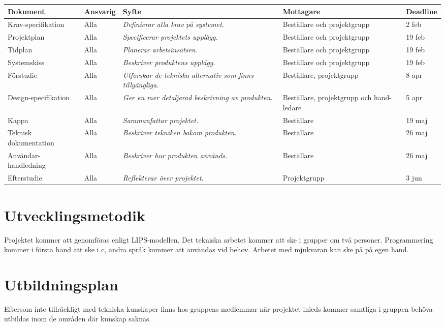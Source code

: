 \documentclass[11pt]{article}
\begin{document}
\begin{flushleft}
\begin{longtable}{| p{.17\linewidth} | p{.11\linewidth} | p{.31\linewidth} | p{.15\linewidth} | p{.11\linewidth} |} \hline
\textbf{Dokument} & \textbf{Ansvarig} & \textbf{Syfte} & \textbf{Mottagare} & \textbf{Deadline} \\ \hline
Krav-specifikation & Alla & \textit{Definierar alla krav på systemet.} & Beställare och projektgrupp & 2 feb \\ \hline
Projektplan & Alla & \textit{Specificerar projektets upplägg.} & Beställare och projektgrupp & 19 feb \\ \hline
Tidplan & Alla & \textit{Planerar arbetsinsatsen.} & Beställare och projektgrupp & 19 feb \\ \hline
Systemskiss & Alla & \textit{Beskriver produktens upplägg.} & Beställare och projektgrupp & 19 feb \\ \hline
Förstudie & Alla & \textit{Utforskar de tekniska alternativ som finns tillgängliga.} & Beställare, projektgrupp & 8 apr \\ \hline
Design-specifikation & Alla & \textit{Ger en mer detaljerad beskrivning av produkten.} & Beställare, projektgrupp och hand-ledare & 5 apr \\ \hline
Kappa & Alla & \textit{Sammanfattar projektet.} & Beställare & 19 maj \\ \hline
Teknisk \mbox{dokumentation} & Alla & \textit{Beskriver tekniken bakom produkten.} & Beställare & 26 maj\\ \hline
Användar-handledning & Alla & \textit{Beskriver hur produkten används.} & Beställare & 26 maj \\ \hline
Efterstudie & Alla & \textit{Reflekterar över projektet.} & Projektgrupp & 3 jun \\ \hline

\end{longtable}

\pagebreak
\section{Utvecklingsmetodik}
Projektet kommer att genomföras enligt LIPS-modellen. Det tekniska arbetet kommer att ske i grupper om två personer. Programmering kommer i första hand att ske i c, andra språk kommer att användas vid behov. Arbetet med mjukvaran kan ske på på egen hand.

\pagebreak
\section{Utbildningsplan}
Eftersom inte tillräckligt med tekniska kunskaper finns hos gruppens medlemmar när projektet inleds kommer samtliga i gruppen behöva utbildas inom de områden där kunskap saknas. 

\end{flushleft}
\end{document}
